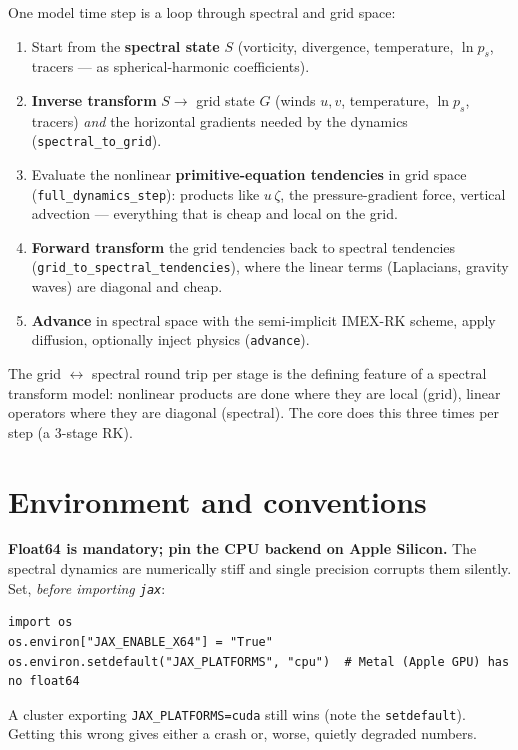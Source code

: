 \documentclass[11pt]{article}
\newcommand{\code}[1]{\texttt{#1}}
\begin{document}
One model time step is a loop through spectral and grid space:
\begin{enumerate}
\item Start from the \textbf{spectral state} $S$ (vorticity, divergence,
  temperature, $\ln p_s$, tracers --- as spherical-harmonic coefficients).
\item \textbf{Inverse transform} $S\to$ grid state $G$ (winds $u,v$, temperature,
  $\ln p_s$, tracers) \emph{and} the horizontal gradients needed by the dynamics
  (\code{spectral\_to\_grid}).
\item Evaluate the nonlinear \textbf{primitive-equation tendencies} in grid space
  (\code{full\_dynamics\_step}): products like $u\,\zeta$, the pressure-gradient
  force, vertical advection --- everything that is cheap and local on the grid.
\item \textbf{Forward transform} the grid tendencies back to spectral tendencies
  (\code{grid\_to\_spectral\_tendencies}), where the linear terms (Laplacians,
  gravity waves) are diagonal and cheap.
\item \textbf{Advance} in spectral space with the semi-implicit IMEX-RK scheme,
  apply diffusion, optionally inject physics (\code{advance}).
\end{enumerate}
The grid $\leftrightarrow$ spectral round trip per stage is the defining feature
of a spectral transform model: nonlinear products are done where they are local
(grid), linear operators where they are diagonal (spectral). The core does this
three times per step (a 3-stage RK).

\section{Environment and conventions}\label{sec:conventions}

\begin{keybox}
\textbf{Float64 is mandatory; pin the CPU backend on Apple Silicon.} The spectral
dynamics are numerically stiff and single precision corrupts them silently. Set,
\emph{before importing \code{jax}}:
\begin{lstlisting}
import os
os.environ["JAX_ENABLE_X64"] = "True"
os.environ.setdefault("JAX_PLATFORMS", "cpu")  # Metal (Apple GPU) has no float64
\end{lstlisting}
A cluster exporting \code{JAX\_PLATFORMS=cuda} still wins (note the
\code{setdefault}). Getting this wrong gives either a crash or, worse, quietly
degraded numbers.
\end{keybox}
\end{document}
